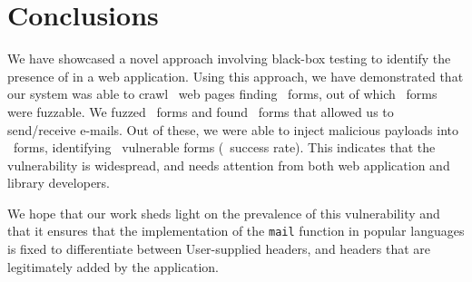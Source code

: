 \section{Conclusions}
We have showcased a novel approach involving black-box testing to identify the presence of \ehi in a web application. Using this approach, we have demonstrated that our system was able to crawl \urls\ web pages finding \forms\ forms, out of which \emailforms\ forms were fuzzable. We fuzzed \fuzzed\ forms and found \recd\  forms that allowed us to send/receive e-mails. Out of these, we were able to inject malicious payloads into \malfuzzed\ forms, identifying \success\ vulnerable forms (\successDelta\ success rate). This indicates that the vulnerability is widespread, and needs attention from both web application and library developers. 

We hope that our work sheds light on the prevalence of this vulnerability and that it ensures that the implementation of the \texttt{mail} function in popular languages is fixed to differentiate between User-supplied headers, and headers that are legitimately added by the application.
